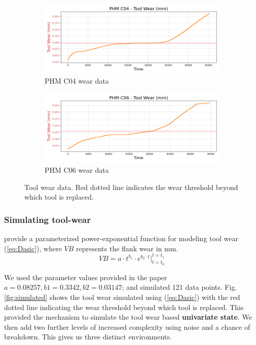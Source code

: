 \documentclass[a4paper, 12pt]{article}
\begin{document}
\begin{figure}[ht]
	\begin{subfigure}[b]{0.5\textwidth}
		\centering
		\includegraphics[width=\textwidth]{PHM_C04_wear_plot.png}  
		\caption{PHM C04 wear data}
		\label{fig:C04}
	\end{subfigure}
	\hfill
	\begin{subfigure}[b]{0.5\textwidth}
		\centering
		\includegraphics[width=\textwidth]{PHM_C06_wear_plot.png}  
		\caption{PHM C06 wear data}
		\label{fig:C06}
	\end{subfigure} 
	\label{fig:tool-wear-plots}
	\caption{Tool wear data. Red dotted line indicates the wear threshold beyond which tool is replaced.}
\end{figure}

\subsubsection*{Simulating tool-wear}
\cite{dasic2006} provide a parameterized power-exponential function for modeling tool wear (\ref{eq:Dasic}), where $VB$ represents the flank wear in mm.
\begin{equation}
	VB = a \cdot t^{b_1} \cdot e^{b_2 \cdot t} \Big|_{t=t_0}^{t=t_1}
	\label{eq:Dasic}
\end{equation}

We used the parameter values provided in the paper $a=0.08257, b1=0.3342, b2=0.03147$; and simulated 121 data points. Fig. \ref{fig:simulated} shows the tool wear simulated using (\ref{eq:Dasic}) with the red dotted line indicating the wear threshold beyond which tool is replaced. This provided the mechanism to simulate the tool wear based \textbf{univariate state}. We then add two further levels of increased complexity using noise and a chance of breakdown. This gives us three distinct environments. 
\end{document}
